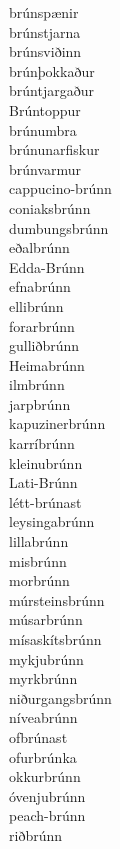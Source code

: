 \documentclass[../samsetningasafn.tex]{subfiles}
\begin{document}
\begin{bigwordlist}
\begin{footnotesize}
\begin{multicols}{4}
\begin{description}
		\item [brúnspænir]
		\item [brúnstjarna]
		\item [brúnsviðinn]
		\item [brúnþokkaður]
		\item [brúntjargaður]
		\item [Brúntoppur]
		\item [brúnumbra]
		\item [brúnunarfiskur]
		\item [brúnvarmur]
		\item [cappucino-brúnn]
		\item [coniaksbrúnn]
		\item [dumbungsbrúnn]
		\item [eðalbrúnn]
		\item [Edda-Brúnn]
		\item [efnabrúnn]
		\item [ellibrúnn]
		\item [forarbrúnn]
		\item [gulliðbrúnn]
		\item [Heimabrúnn]
		\item [ilmbrúnn]
		\item [jarpbrúnn]
		\item [kapuzinerbrúnn]
		\item [karríbrúnn]
		\item [kleinubrúnn]
		\item [Lati-Brúnn]
		\item [létt-brúnast]
		\item [leysingabrúnn]
		\item [lillabrúnn]
		\item [misbrúnn]
		\item [morbrúnn]
		\item [múrsteinsbrúnn]
		\item [músarbrúnn]
		\item [mísaskítsbrúnn]
		\item [mykjubrúnn]
		\item [myrkbrúnn]
		\item [niðurgangsbrúnn]
		\item [níveabrúnn]
		\item [ofbrúnast]
		\item [ofurbrúnka]
		\item [okkurbrúnn]
		\item [óvenjubrúnn]
		\item [peach-brúnn]
		\item [riðbrúnn]

\end{description}
\end{multicols}
\end{footnotesize}
\end{bigwordlist}
\end{document}
